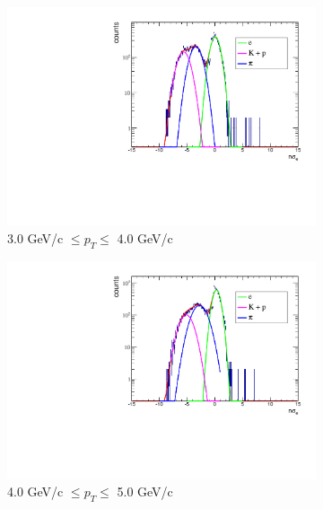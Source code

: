 \begin{figure}[htbp]
    \begin{subfigure}{0.5\textwidth}
        \includegraphics[width=\textwidth]{Plots/NPE/nsigmae/nsig_3_4.pdf}
        \caption{3.0 GeV/c $\leq p_{T} \leq$ 4.0 GeV/c}
        \label{fig:nsigma_3_4}
    \end{subfigure}
    \begin{subfigure}{0.5\textwidth}
        \includegraphics[width=\textwidth]{Plots/NPE/nsigmae/nsig_4_5.pdf}
        \caption{4.0 GeV/c $\leq p_{T} \leq$ 5.0 GeV/c}
        \label{fig:nsigma_4_5}
    \end{subfigure}
    \begin{subfigure}{0.5\textwidth}

\end{subfigure}
\end{figure}
